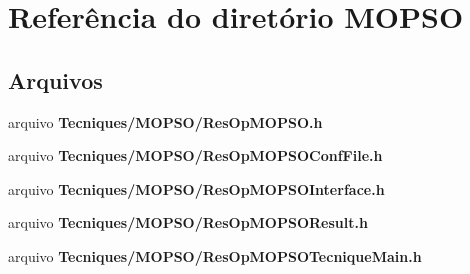 \section{Referência do diretório M\+O\+P\+SO}
\label{dir_bc206d43d240e7ee4f652632c345f791}
\subsection*{Arquivos}
\begin{DoxyCompactItemize}
\item 
arquivo {\bf Tecniques/\+M\+O\+P\+S\+O/\+Res\+Op\+M\+O\+P\+S\+O.\+h}
\item 
arquivo {\bf Tecniques/\+M\+O\+P\+S\+O/\+Res\+Op\+M\+O\+P\+S\+O\+Conf\+File.\+h}
\item 
arquivo {\bf Tecniques/\+M\+O\+P\+S\+O/\+Res\+Op\+M\+O\+P\+S\+O\+Interface.\+h}
\item 
arquivo {\bf Tecniques/\+M\+O\+P\+S\+O/\+Res\+Op\+M\+O\+P\+S\+O\+Result.\+h}
\item 
arquivo {\bf Tecniques/\+M\+O\+P\+S\+O/\+Res\+Op\+M\+O\+P\+S\+O\+Tecnique\+Main.\+h}
\end{DoxyCompactItemize}
